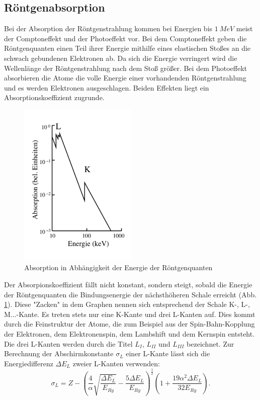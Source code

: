 \subsection{Röntgenabsorption}
Bei der Absorption der Röntgenstrahlung kommen bei Energien bis $\SI{1}{MeV}$ meist der Comptoneffekt und der Photoeffekt vor.
Bei dem Comptoneffekt geben die Röntgenquanten einen Teil ihrer Energie mithilfe eines elastischen Stoßes an die schwach gebundenen Elektronen ab.
Da sich die Energie verringert wird die Wellenlänge der Röntgenstrahlung nach dem Stoß größer.
Bei dem Photoeffekt absorbieren die Atome die volle Energie einer vorhandenden Röntgenstrahlung und es werden Elektronen ausgeschlagen.
Beiden Effekten liegt ein Absorptionskoeffizient zugrunde.
\begin{figure}[h!]
  \centering
  \includegraphics[width=0.5\textwidth]{absorption.pdf}
  \caption{Absorption in Abhängigkeit der Energie der Röntgenquanten \cite{1}}
  \label{fig:absorption}
\end{figure}
Der Absorpionskoeffizient fällt nicht konstant, sondern steigt, sobald die Energie der Röntgenquanten die Bindungsenergie der nächsthöheren Schale erreicht (Abb. \ref{fig:absorption}).
Diese "Zacken" in dem Graphen nennen sich entsprechend der Schale K-, L-, M...-Kante.
Es treten stets nur eine K-Kante und drei L-Kanten auf.
Dies kommt durch die Feinstruktur der Atome, die zum Beispiel aus der Spin-Bahn-Kopplung der Elektronen, dem Elektronenspin, dem Lambshift und dem Kernspin entsteht.
Die drei L-Kanten werden durch die Titel $L_{I}$, $L_{II}$ und $L_{III}$ bezeichnet.
Zur Berechnung der Abschirmkonstante $\sigma_{L}$ einer L-Kante lässt sich die Energiedifferenz $\Delta E_{L}$ zweier L-Kanten verwenden:
\begin{equation}
  \sigma_{L}=Z- \left( \frac{4}{\alpha} \sqrt{\frac{\Delta E_{L}}{E_{Ry}}}-\frac{5 \Delta E_{L}}{E_{Ry}} \right)^{\frac{1}{2}} \left(1+ \frac{19 \alpha^2  \Delta E_{L}}{32  E_{Ry}} \right).
  \label{eqn:sigL}
\end{equation}

\FloatBarrier
